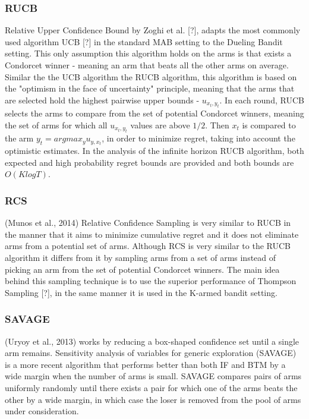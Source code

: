 \documentclass{llncs}
\begin{document}
	

\newpage

\subsubsection{RUCB} Relative Upper Confidence Bound by Zoghi et al. [?], adapts the most commonly used algorithm UCB [?] in the standard MAB setting to the Dueling Bandit setting. 
	This only assumption this algorithm holds on the arms is that exists a Condorcet winner - meaning an arm that beats all the other arms on average. 
	Similar the the UCB algorithm the RUCB algorithm, this algorithm is based on the "optimism in the face of uncertainty" principle, meaning that the arms that are selected hold the highest pairwise upper bounds - $u_{x_t,y_t}$.
	In each round, RUCB selects the arms to compare from the set of potential Condorcet winners, meaning the set of arms for which all $u_{x_t,y_t}$ values are above $1/2$.
	Then $x_t$ is compared to the arm $y_t = argmax_{y} u_{y,x_t}$, in order to minimize regret, taking into account the optimistic estimates. 
	In the analysis of the infinite horizon RUCB algorithm, both expected and high probability regret bounds are provided and both bounds are $O(K log T)$.  
	
	
	\newpage
\subsubsection{RCS}
	(Munos et al., 2014) Relative Confidence Sampling is very similar to RUCB in the manner that it aims to minimize cumulative regret and it does not eliminate arms from a potential set of arms.
	Although RCS is very similar to the RUCB algorithm it differs from it by sampling arms from a set of arms instead of picking an arm from the set of potential Condorcet winners.  
	The main idea behind this sampling technique is to use the superior performance of Thompson Sampling [?], in the same manner it is used in the K-armed bandit setting. 

	
	\newpage
\subsubsection{SAVAGE}
	(Uryoy et al., 2013) works by reducing a box-shaped confidence set until a single arm remains.
	Sensitivity analysis of variables for generic exploration (SAVAGE) is a more recent algorithm that performs better than both IF and BTM by a wide margin when the number of arms is small. 
	SAVAGE compares pairs of arms uniformly randomly until there exists a pair for which one of the arms beats the other by a wide margin, in which case the loser is removed from the pool of arms under consideration.

\newpage
\end{document}
